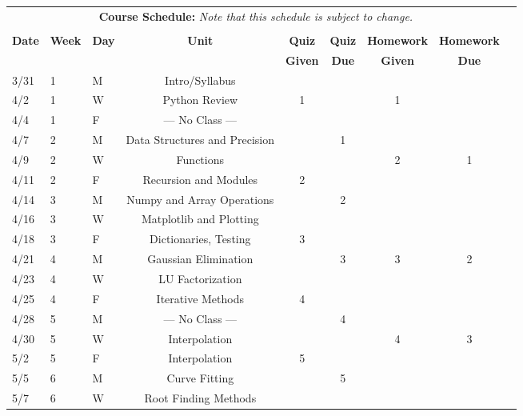 \documentclass[11pt, a4paper]{article}
\begin{document}
\pagebreak
\FloatBarrier
\renewcommand{\arraystretch}{1}
\begin{table}[h]
\begin{center}
\begin{tabular}{lllcccccc}
\multicolumn{8}{c}{\textbf{Course Schedule:}\textit{ Note that this schedule is
subject to change.}}\\
&&&&&&&&\\
\textbf{Date} & \textbf{Week} & \textbf{Day} & \textbf{Unit} & \textbf{Quiz} & \textbf{Quiz}& \textbf{Homework} & \textbf{Homework}\\
              &  &  &  & \textbf{Given}  & \textbf{Due\footnotemark[1]}  & \textbf{Given} & \textbf{Due\footnotemark[2]}\\ \hline
\hline
3/31 & 1 & M & Intro/Syllabus                     &   &   &   &  \\
4/2  & 1 & W & Python Review                      & 1 &   & 1 &  \\
4/4  & 1 & F & --- No Class ---                   &   &   &   &  \\
4/7  & 2 & M & Data Structures and Precision      &   & 1 &   &  \\
4/9  & 2 & W & Functions                          &   &   & 2 & 1 \\
4/11 & 2 & F & Recursion and Modules              & 2 &   &   &  \\
4/14 & 3 & M & Numpy and Array Operations         &   & 2 &   &  \\
4/16 & 3 & W & Matplotlib and Plotting            &   &   &   &  \\
4/18 & 3 & F & Dictionaries, Testing              & 3 &   &   &  \\
4/21 & 4 & M & Gaussian Elimination               &   & 3 & 3 & 2\\
4/23 & 4 & W & LU Factorization                   &   &   &   &  \\
4/25 & 4 & F & Iterative Methods                  & 4 &   &   &  \\
4/28 & 5 & M & --- No Class ---                   &   & 4 &   &  \\
4/30 & 5 & W & Interpolation                      &   &   & 4 & 3\\
5/2  & 5 & F & Interpolation                      & 5 &   &   &  \\
5/5  & 6 & M & Curve Fitting                      &   & 5 &   &  \\
5/7  & 6 & W &        Root Finding Methods        &   &   &   &  \\

\end{tabular}
\end{center}
\end{table}
\end{document}
